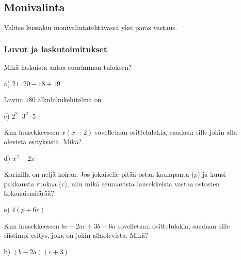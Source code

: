 \newpage
\subsection*{Monivalinta}

Valitse kussakin monivalintatehtävässä yksi paras vastaus.

\subsubsection*{Luvut ja laskutoimitukset}

\begin{tehtava}
Mikä laskuista antaa suurimman tuloksen?
	\begin{vastaus}
	 a) $21\cdot 20-18+19$
	\end{vastaus}
\end{tehtava}

\begin{tehtava}
Luvun $180$ alkulukukehitelmä on
	\begin{vastaus}
	 e) $2^2\cdot3^2\cdot5$
	\end{vastaus}
\end{tehtava}

\begin{tehtava}
Kun lausekkeeseen $x(x-2)$ sovelletaan osittelulakia, saadaan sille jokin alla olevista esityksistä. Mikä?
    \begin{vastaus}
	d) $x^2-2x$
    \end{vastaus}
\end{tehtava}

\begin{tehtava}
Karinilla on neljä koiraa. Jos jokaiselle pitää ostaa kaulapanta ($p$) ja kuusi pakkausta ruokaa ($r$), niin mikä seuraavista lausekkeista vastaa ostosten kokonaismäärää?
    \begin{vastaus}
	e) $4(p+6r)$
    \end{vastaus}
\end{tehtava}

\begin{tehtava}
Kun lausekkeeseen $bc-2ac+3b-6a$ sovelletaan osittelulakia, saadaan sille siistimpi esitys, joka on jokin allaolevista. Mikä?
    \begin{vastaus}
	b) $(b-2a)(c+3)$
    \end{vastaus}
\end{tehtava}

